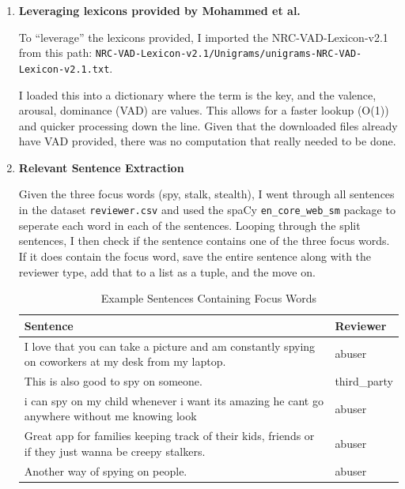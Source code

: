 \documentclass[12pt]{article}
\begin{document}
\begin{enumerate}
    \item \textbf{Leveraging lexicons provided by Mohammed et al.}
    
    To ``leverage'' the lexicons provided, I imported the NRC-VAD-Lexicon-v2.1 from 
    this path: \texttt{NRC-VAD-Lexicon-v2.1/Unigrams/unigrams-NRC-VAD-Lexicon-v2.1.txt}. 
    
    I loaded this into a dictionary where the term is the key, and the valence, arousal, dominance (VAD) are values. 
    This allows for a faster lookup (O(1)) and quicker processing down the line. Given that the 
    downloaded files already have VAD provided, there was no computation that 
    really needed to be done.

    \item \textbf{Relevant Sentence Extraction}
    
    Given the three focus words (spy, stalk, stealth), I went through all sentences in the dataset
    \texttt{reviewer.csv} and used the spaCy \texttt{en\_core\_web\_sm} package to seperate each word in each of the sentences. 
    Looping through the split sentences, I then check if the sentence contains one of the three focus words. 
    If it does contain the focus word, save the entire sentence along with the reviewer type, add that to a list 
    as a tuple, and the move on. 

    \begin{table}[H]
        \centering
        \renewcommand{\arraystretch}{1.4}
        \begin{tabular}{p{10cm} p{3cm}}
            \toprule
            \rowcolor{tableheader}
            \color{white}\textbf{Sentence} & \color{white}\textbf{Reviewer} \\
            \midrule
            \rowcolor{rowalt} I love that you can take a picture and am constantly spying on coworkers at my desk from my laptop. & abuser \\
            This is also good to spy on someone. & third\_party \\
            \rowcolor{rowalt} i can spy on my child whenever i want its amazing he cant go anywhere without me knowing look & abuser \\
            Great app for families keeping track of their kids, friends or if they just wanna be creepy stalkers. & abuser \\
            \rowcolor{rowalt} Another way of spying on people. & abuser \\
            \bottomrule
        \end{tabular}
        \caption{Example Sentences Containing Focus Words}
        \label{tab:sentences}
    \end{table}


\end{enumerate}
\end{document}
